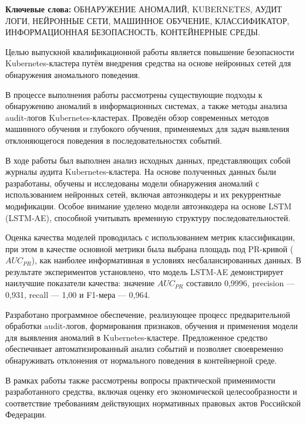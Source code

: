 \abstract

\textbf{Ключевые слова:} ОБНАРУЖЕНИЕ АНОМАЛИЙ, KUBERNETES, АУДИТ ЛОГИ, НЕЙРОННЫЕ СЕТИ, МАШИННОЕ ОБУЧЕНИЕ, КЛАССИФИКАТОР, ИНФОРМАЦИОННАЯ БЕЗОПАСНОСТЬ, КОНТЕЙНЕРНЫЕ СРЕДЫ.

Целью выпускной квалификационной работы является повышение безопасности Kubernetes-кластера путём внедрения средства на основе нейронных сетей для обнаружения аномального поведения.

В процессе выполнения работы рассмотрены существующие подходы к обнаружению аномалий в информационных системах, а также методы анализа audit-логов Kubernetes-кластерах. Проведён обзор современных методов машинного обучения и глубокого обучения, применяемых для задач выявления отклоняющегося поведения в последовательностях событий.

В ходе работы был выполнен анализ исходных данных, представляющих собой журналы аудита Kubernetes-кластера. На основе полученных данных были разработаны, обучены и исследованы модели обнаружения аномалий с использованием нейронных сетей, включая автоэнкодеры и их рекуррентные модификации. Особое внимание уделено модели автоэнкодера на основе LSTM (LSTM-AE), способной учитывать временную структуру последовательностей.

Оценка качества моделей проводилась с использованием метрик классификации, при этом в качестве основной метрики была выбрана площадь под PR-кривой ($AUC_{PR}$), как наиболее информативная в условиях несбалансированных данных. В результате экспериментов установлено, что модель LSTM-AE демонстрирует наилучшие показатели качества: значение $AUC_{PR}$ составило 0,9996, precision — 0,931, recall — 1,00 и F1-мера — 0,964.

Разработано программное обеспечение, реализующее процесс предварительной обработки audit-логов, формирования признаков, обучения и применения модели для выявления аномалий в Kubernetes-кластере. Предложенное средство обеспечивает автоматизированный анализ событий и позволяет своевременно обнаруживать отклонения от нормального поведения в контейнерной среде.

В рамках работы также рассмотрены вопросы практической применимости разработанного средства, включая оценку его экономической целесообразности и соответствие требованиям действующих нормативных правовых актов Российской Федерации.